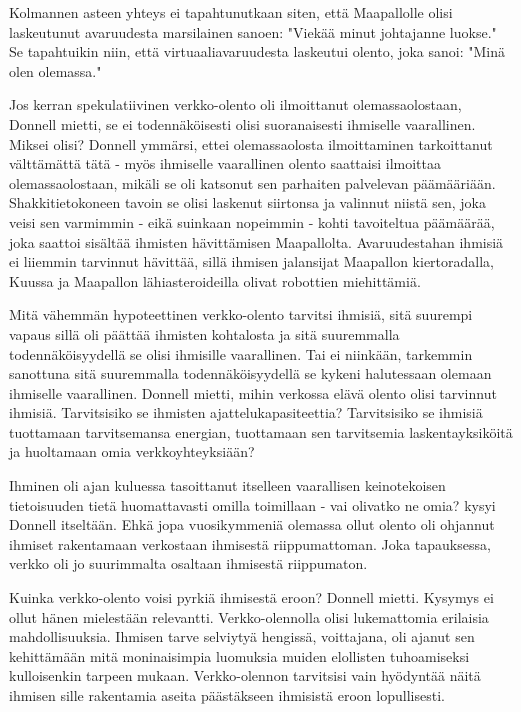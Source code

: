 Kolmannen asteen yhteys ei tapahtunutkaan siten, että Maapallolle olisi laskeutunut avaruudesta marsilainen sanoen: "Viekää minut johtajanne luokse." Se tapahtuikin niin, että virtuaaliavaruudesta laskeutui olento, joka sanoi: "Minä olen olemassa."


Jos kerran spekulatiivinen verkko-olento oli ilmoittanut olemassaolostaan, Donnell mietti, se ei todennäköisesti olisi suoranaisesti ihmiselle vaarallinen. Miksei olisi? Donnell ymmärsi, ettei olemassaolosta ilmoittaminen tarkoittanut välttämättä tätä - myös ihmiselle vaarallinen olento saattaisi ilmoittaa olemassaolostaan, mikäli se oli katsonut sen parhaiten palvelevan päämääriään. Shakkitietokoneen tavoin se olisi laskenut siirtonsa ja valinnut niistä sen, joka veisi sen varmimmin - eikä suinkaan nopeimmin - kohti tavoiteltua päämäärää, joka saattoi sisältää ihmisten hävittämisen Maapallolta. Avaruudestahan ihmisiä ei liiemmin tarvinnut hävittää, sillä ihmisen jalansijat Maapallon kiertoradalla, Kuussa ja Maapallon lähiasteroideilla olivat robottien miehittämiä.


Mitä vähemmän hypoteettinen verkko-olento tarvitsi ihmisiä, sitä suurempi vapaus sillä oli päättää ihmisten kohtalosta ja sitä suuremmalla todennäköisyydellä se olisi ihmisille vaarallinen. Tai ei niinkään, tarkemmin sanottuna sitä suuremmalla todennäköisyydellä se kykeni halutessaan olemaan ihmiselle vaarallinen. Donnell mietti, mihin verkossa elävä olento olisi tarvinnut ihmisiä. Tarvitsisiko se ihmisten ajattelukapasiteettia? Tarvitsisiko se ihmisiä tuottamaan tarvitsemansa energian, tuottamaan sen tarvitsemia laskentayksiköitä ja huoltamaan omia verkkoyhteyksiään?


Ihminen oli ajan kuluessa tasoittanut itselleen vaarallisen keinotekoisen tietoisuuden tietä huomattavasti omilla toimillaan - vai olivatko ne omia? kysyi Donnell itseltään. Ehkä jopa vuosikymmeniä olemassa ollut olento oli ohjannut ihmiset rakentamaan verkostaan ihmisestä riippumattoman. Joka tapauksessa, verkko oli jo suurimmalta osaltaan ihmisestä riippumaton.


Kuinka verkko-olento voisi pyrkiä ihmisestä eroon? Donnell mietti. Kysymys ei ollut hänen mielestään relevantti. Verkko-olennolla olisi lukemattomia erilaisia mahdollisuuksia. Ihmisen tarve selviytyä hengissä, voittajana, oli ajanut sen kehittämään mitä moninaisimpia luomuksia muiden elollisten tuhoamiseksi kulloisenkin tarpeen mukaan. Verkko-olennon tarvitsisi vain hyödyntää näitä ihmisen sille rakentamia aseita päästäkseen ihmisistä eroon lopullisesti.


